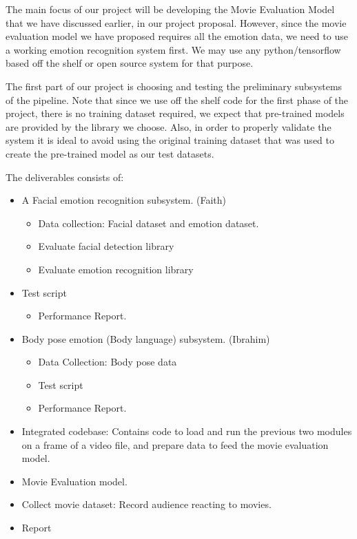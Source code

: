\documentclass[12pt,a4paper,man]{report}
\begin{document}
The main focus of our project will be developing the Movie Evaluation Model that we have discussed earlier, in our project proposal. However, since the movie evaluation model we have proposed requires all the emotion data, we need to use a working emotion recognition system first. We may use any python/tensorflow based off the shelf or open source system for that purpose. 

The first part of our project is choosing and testing the preliminary subsystems of the pipeline. Note that since we use off the shelf code for the first phase of the project, there is no training dataset required, we expect that pre-trained models are provided by the library we choose. Also, in order to properly validate the system it is ideal to avoid using the original training dataset that was used to create the pre-trained model as our test datasets. 

The deliverables consists of:
\begin{itemize}
\item A Facial emotion recognition subsystem. (Faith) 
\begin{itemize}
\item Data collection: Facial dataset and emotion dataset.
\item Evaluate facial detection library
\item Evaluate emotion recognition library
\end{itemize}
\item Test script
\begin{itemize}
\item Performance Report.
\end{itemize}
\item Body pose emotion (Body language) subsystem. (Ibrahim)
\begin{itemize}
\item Data Collection: Body pose data
\item Test script
\item Performance Report.
\end{itemize}
\item Integrated codebase: Contains code to load and run the previous two modules on a frame of a video file, and prepare data to feed the movie evaluation model.
\item Movie Evaluation model.
\item Collect movie dataset: Record audience reacting to movies.
\item Report
\end{itemize}
\end{document}
